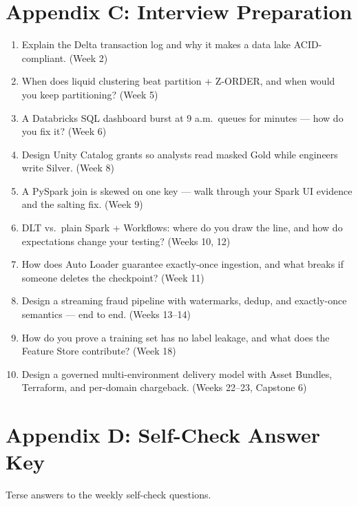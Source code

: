 \documentclass[11pt, a4paper]{article}
\begin{document}
\section{Appendix C: Interview Preparation}
\begin{enumerate}[itemsep=1pt]
    \item Explain the Delta transaction log and why it makes a data lake ACID-compliant. (Week 2)
    \item When does liquid clustering beat partition + Z-ORDER, and when would you keep partitioning? (Week 5)
    \item A Databricks SQL dashboard burst at 9 a.m.\ queues for minutes --- how do you fix it? (Week 6)
    \item Design Unity Catalog grants so analysts read masked Gold while engineers write Silver. (Week 8)
    \item A PySpark join is skewed on one key --- walk through your Spark UI evidence and the salting fix. (Week 9)
    \item DLT vs.\ plain Spark + Workflows: where do you draw the line, and how do expectations change your testing? (Weeks 10, 12)
    \item How does Auto Loader guarantee exactly-once ingestion, and what breaks if someone deletes the checkpoint? (Week 11)
    \item Design a streaming fraud pipeline with watermarks, dedup, and exactly-once semantics --- end to end. (Weeks 13--14)
    \item How do you prove a training set has no label leakage, and what does the Feature Store contribute? (Week 18)
    \item Design a governed multi-environment delivery model with Asset Bundles, Terraform, and per-domain chargeback. (Weeks 22--23, Capstone 6)
\end{enumerate}

\newpage
\section{Appendix D: Self-Check Answer Key}
Terse answers to the weekly self-check questions.
\end{document}
